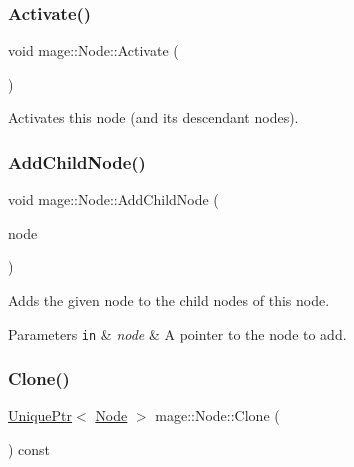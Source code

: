 \subsubsection{\texorpdfstring{Activate()}{Activate()}}
{\footnotesize\ttfamily void mage\+::\+Node\+::\+Activate (\begin{DoxyParamCaption}{ }\end{DoxyParamCaption})\hspace{0.3cm}{\ttfamily [noexcept]}}

Activates this node (and its descendant nodes). \hypertarget{classmage_1_1_node_a11a7c052c5e4a6713d60aaad67dfde5d}{}\label{classmage_1_1_node_a11a7c052c5e4a6713d60aaad67dfde5d} 
\subsubsection{\texorpdfstring{Add\+Child\+Node()}{AddChildNode()}}
{\footnotesize\ttfamily void mage\+::\+Node\+::\+Add\+Child\+Node (\begin{DoxyParamCaption}\item[{\hyperlink{namespacemage_a1e01ae66713838a7a67d30e44c67703e}{Shared\+Ptr}$<$ \hyperlink{classmage_1_1_node}{Node} $>$}]{node }\end{DoxyParamCaption})}

Adds the given node to the child nodes of this node.


\begin{DoxyParams}[1]{Parameters}
\mbox{\tt in}  & {\em node} & A pointer to the node to add. \\
\hline
\end{DoxyParams}
\hypertarget{classmage_1_1_node_a18e08151571435d319be2414474c93c0}{}\label{classmage_1_1_node_a18e08151571435d319be2414474c93c0} 
\subsubsection{\texorpdfstring{Clone()}{Clone()}}
{\footnotesize\ttfamily \hyperlink{namespacemage_a3316d7143a973e37adf1110f2e80ca31}{Unique\+Ptr}$<$ \hyperlink{classmage_1_1_node}{Node} $>$ mage\+::\+Node\+::\+Clone (\begin{DoxyParamCaption}{ }\end{DoxyParamCaption}) const}

